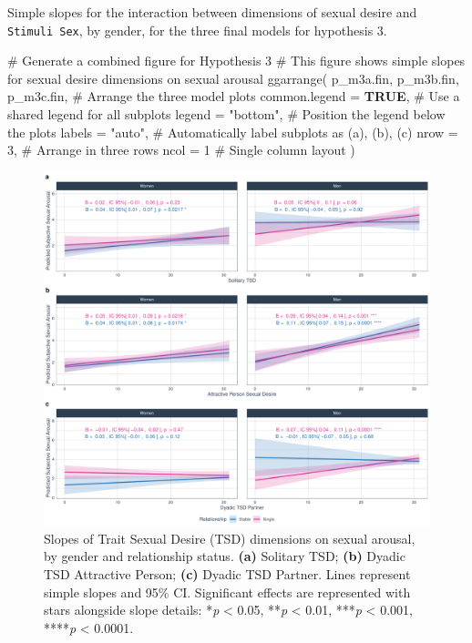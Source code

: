 \documentclass[
  bookmarksnumbered]{article}
\newenvironment{Shaded}{\begin{snugshade}}{\end{snugshade}}
\newcommand{\AttributeTok}[1]{\textcolor[rgb]{0.80,0.80,0.80}{#1}}
\newcommand{\CommentTok}[1]{\textcolor[rgb]{0.50,0.62,0.50}{#1}}
\newcommand{\ConstantTok}[1]{\textcolor[rgb]{0.86,0.64,0.64}{\textbf{#1}}}
\newcommand{\DecValTok}[1]{\textcolor[rgb]{0.86,0.86,0.80}{#1}}
\newcommand{\FunctionTok}[1]{\textcolor[rgb]{0.94,0.94,0.56}{#1}}
\newcommand{\NormalTok}[1]{\textcolor[rgb]{0.80,0.80,0.80}{#1}}
\newcommand{\StringTok}[1]{\textcolor[rgb]{0.80,0.58,0.58}{#1}}
\begin{document}
Simple slopes for the interaction between dimensions of sexual desire and \texttt{Stimuli\ Sex}, by gender, for the three final models for hypothesis 3.

\begin{Shaded}
\begin{Highlighting}[]
\CommentTok{\# Generate a combined figure for Hypothesis 3}
\CommentTok{\# This figure shows simple slopes for sexual desire dimensions on sexual arousal}
\FunctionTok{ggarrange}\NormalTok{(}
\NormalTok{  p\_m3a.fin, p\_m3b.fin, p\_m3c.fin, }\CommentTok{\# Arrange the three model plots}
  \AttributeTok{common.legend =} \ConstantTok{TRUE}\NormalTok{, }\CommentTok{\# Use a shared legend for all subplots}
  \AttributeTok{legend =} \StringTok{"bottom"}\NormalTok{, }\CommentTok{\# Position the legend below the plots}
  \AttributeTok{labels =} \StringTok{"auto"}\NormalTok{, }\CommentTok{\# Automatically label subplots as (a), (b), (c)}
  \AttributeTok{nrow =} \DecValTok{3}\NormalTok{, }\CommentTok{\# Arrange in three rows}
  \AttributeTok{ncol =} \DecValTok{1} \CommentTok{\# Single column layout}
\NormalTok{)}
\end{Highlighting}
\end{Shaded}

\begin{figure}
\centering
\includegraphics{Sexual_Desire_Arousal_anonymous_files/figure-latex/fig-m3-fin-1.pdf}
\caption{\label{fig:fig-m3-fin}Slopes of Trait Sexual Desire (TSD) dimensions on sexual arousal, by gender and relationship status. \textbf{(a)} Solitary TSD; \textbf{(b)} Dyadic TSD Attractive Person; \textbf{(c)} Dyadic TSD Partner. Lines represent simple slopes and 95\% CI. Significant effects are represented with stars alongside slope details: *\emph{p} \textless{} 0.05, **\emph{p} \textless{} 0.01, ***\emph{p} \textless{} 0.001, ****\emph{p} \textless{} 0.0001.}
\end{figure}
\end{document}
